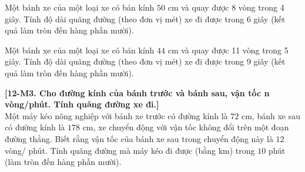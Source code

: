 \documentclass[12pt,a4paper]{article}
\begin{document}
\begin{ex}
 Một bánh xe của một loại xe có bán kính ${50}$ cm và quay được 8 vòng trong 4 giây. Tính độ dài quãng đường (theo đơn vị mét) xe đi được trong 6 giây (kết quả làm tròn đến hàng phần mười). 

\end{ex}

\begin{ex}
 Một bánh xe của một loại xe có bán kính ${44}$ cm và quay được 11 vòng trong 5 giây. Tính độ dài quãng đường (theo đơn vị mét) xe đi được trong 9 giây (kết quả làm tròn đến hàng phần mười). 

\end{ex}

\begin{ex}
 \textbf{[12-M3. Cho đường kính của bánh trước và bánh sau, vận tốc n vòng/phút. Tính quãng đường xe đi.]} \\ Một máy kéo nông nghiệp với bánh xe trước có đường kính là ${72}$ cm, bánh xe sau có đường kính là ${178}$ cm,  xe chuyển động với vận tốc không đổi trên một đoạn đường thẳng. Biết rằng vận tốc của bánh xe sau trong chuyển động này là ${12}$ vòng/ phút. Tính quãng đường mà máy kéo đi được (bằng km) trong ${10}$ phút (làm tròn đến hàng phần mười).\\ 

\end{ex}
\end{document}
